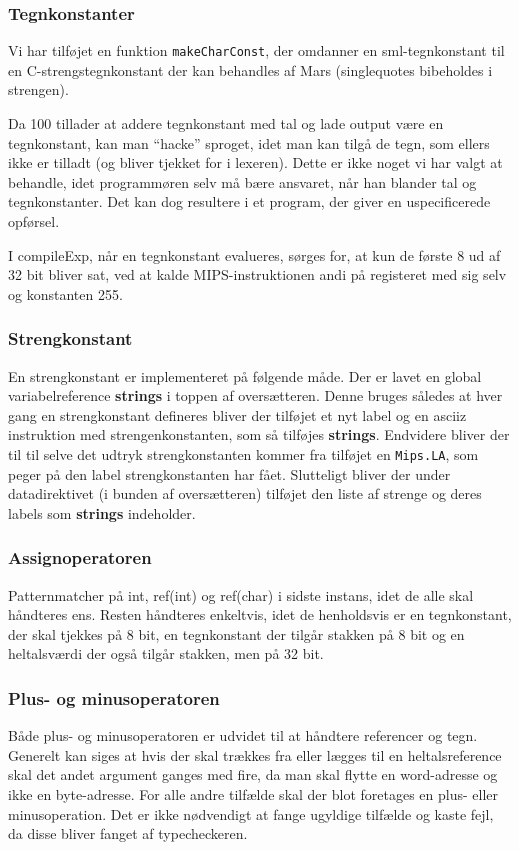 \documentclass[a4paper, 10pt]{article}
\begin{document}
\subsubsection{Tegnkonstanter}
Vi har tilføjet en funktion \texttt{makeCharConst}, der omdanner en
sml-tegnkonstant til en C-strengstegnkonstant der kan behandles af Mars
(singlequotes bibeholdes i strengen).

Da 100 tillader at addere tegnkonstant med tal og lade output være en
tegnkonstant, kan man ``hacke'' sproget, idet man kan tilgå de tegn, som ellers
ikke er tilladt (og bliver tjekket for i lexeren). Dette er ikke noget vi har
valgt at behandle, idet programmøren selv må bære ansvaret, når han blander tal
og tegnkonstanter. Det kan dog resultere i et program, der giver en
uspecificerede opførsel.

I compileExp, når en tegnkonstant evalueres, sørges for, at kun de første 8 ud
af 32 bit bliver sat, ved at kalde MIPS-instruktionen andi på registeret med
sig selv og konstanten 255. 

\subsubsection{Strengkonstant}
En strengkonstant er implementeret på følgende måde. Der er lavet en global 
variabelreference \textbf{strings} i toppen af oversætteren. Denne bruges således
at hver gang en strengkonstant defineres bliver der tilføjet et nyt label og en
asciiz instruktion med strengenkonstanten, som så tilføjes \textbf{strings}. 
Endvidere bliver der til til selve det udtryk strengkonstanten kommer fra tilføjet
en \texttt{Mips.LA}, som peger på den label strengkonstanten har fået. 
Slutteligt bliver der under datadirektivet (i bunden af oversætteren) tilføjet den
liste af strenge og deres labels som \textbf{strings} indeholder.

\subsubsection{Assignoperatoren}
Patternmatcher på int, ref(int) og ref(char) i sidste instans,
idet de alle skal håndteres ens. Resten håndteres enkeltvis, idet de
henholdsvis er en tegnkonstant, der skal tjekkes på 8 bit, en tegnkonstant
der tilgår stakken på 8 bit og en heltalsværdi der også tilgår
stakken, men på 32 bit.

\subsubsection{Plus- og minusoperatoren}
Både plus- og minusoperatoren er udvidet til at håndtere referencer og tegn. 
Generelt kan siges at hvis der skal trækkes fra eller lægges til en heltalsreference
skal det andet argument ganges med fire, da man skal flytte en word-adresse og 
ikke en byte-adresse. For alle andre tilfælde skal der blot foretages en plus- eller
minusoperation. Det er ikke nødvendigt at fange ugyldige tilfælde og kaste fejl,
da disse bliver fanget af typecheckeren.
\end{document}
